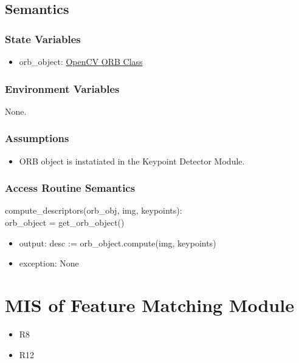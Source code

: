 \documentclass[12pt, titlepage]{article}
\begin{document}
\subsection{Semantics}
\subsubsection{State Variables}
\begin{itemize}
\item orb\_object: \href{https://docs.opencv.org/3.4/db/d95/classcv_1_1ORB.html}{OpenCV ORB Class}
\end{itemize}


\subsubsection{Environment Variables}
None.

\subsubsection{Assumptions}
\begin{itemize}
\item ORB object is instatiated in the Keypoint Detector Module.
\end{itemize}


\subsubsection{Access Routine Semantics}

\noindent compute\_descriptors(orb\_obj, img, keypoints):\\
orb\_object = get\_orb\_object()
\begin{itemize}
\item output: desc := orb\_object.compute(img, keypoints)
\item exception: None 
\end{itemize}




\section{MIS of Feature Matching Module} \label{mFM}
\begin{itemize}
  \item R8
  \item R12
\end{itemize}
\end{document}
